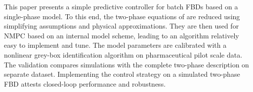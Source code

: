 This paper presents a simple predictive controller for batch \glspl{FBD} based on a single-phase model. To this end, the two-phase equations of \citet{fbd2phFG} are reduced using simplifying assumptions and physical approximations. They are then used for \gls{NMPC} based on an internal model scheme, leading to an algorithm relatively easy to implement and tune. The model parameters are calibrated with a nonlinear grey-box identification algorithm on pharmaceutical pilot scale data. The validation compares simulations with the complete two-phase description on separate dataset. Implementing the control strategy on a simulated two-phase \gls{FBD} attests closed-loop performance and robustness. 